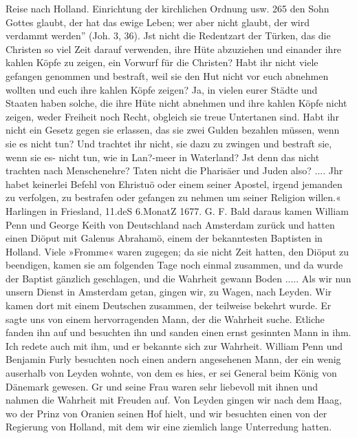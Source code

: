 Reise nach Holland. Einrichtung der kirchlichen Ordnung usw. 265
den Sohn Gottes glaubt, der hat das ewige Leben; wer aber
nicht glaubt, der wird verdammt werden'' (Joh. 3, 36). Jst
nicht die Redentzart der Türken, das die Christen so viel Zeit
darauf verwenden, ihre Hüte abzuziehen und einander ihre kahlen
Köpfe zu zeigen, ein Vorwurf für die Christen? Habt ihr nicht
viele gefangen genommen und bestraft, weil sie den Hut nicht vor
euch abnehmen wollten und euch ihre kahlen Köpfe zeigen? Ja,
in vielen eurer Städte und Staaten haben solche, die ihre Hüte
nicht abnehmen und ihre kahlen Köpfe nicht zeigen, weder Freiheit
noch Recht, obgleich sie treue Untertanen sind. Habt ihr nicht
ein Gesetz gegen sie erlassen, das sie zwei Gulden bezahlen müssen,
wenn sie es nicht tun? Und trachtet ihr nicht, sie dazu zu zwingen
und bestraft sie, wenn sie es- nicht tun, wie in Lan?-meer in
Waterland? Jst denn das nicht trachten nach Menschenehre?
Taten nicht die Pharisäer und Juden also? ....
Jhr habet keinerlei Befehl von Ehristuö oder einem seiner
Apostel, irgend jemanden zu verfolgen, zu bestrafen oder gefangen
zu nehmen um seiner Religion willen.«
Harlingen in Friesland, 11.deS 6.MonatZ 1677. G. F.
Bald daraus kamen William Penn und George Keith von
Deutschland nach Amsterdam zurück und hatten einen Diöput mit
Galenus Abrahamö, einem der bekanntesten Baptisten in Holland.
Viele »Fromme« waren zugegen; da sie nicht Zeit hatten, den
Diöput zu beendigen, kamen sie am folgenden Tage noch einmal
zusammen, und da wurde der Baptist gänzlich geschlagen, und die
Wahrheit gewann Boden ..... Als wir nun unsern Dienst in
Amsterdam getan, gingen wir, zu Wagen, nach Leyden. Wir
kamen dort mit einem Deutschen zusammen, der teilweise bekehrt
wurde. Er sagte uns von einem hervorragenden Mann, der die
Wahrheit suche. Etliche fanden ihn auf und besuchten ihn und
sanden einen ernst gesinnten Mann in ihm. Ich redete auch mit
ihm, und er bekannte sich zur Wahrheit. William Penn und Benjamin
Furly besuchten noch einen andern angesehenen Mann, der ein wenig
auserhalb von Leyden wohnte, von dem es hies, er sei General
beim König von Dänemark gewesen. Gr und seine Frau waren
sehr liebevoll mit ihnen und nahmen die Wahrheit mit Freuden auf.
Von Leyden gingen wir nach dem Haag, wo der Prinz von
Oranien seinen Hof hielt, und wir besuchten einen von der Regierung
von Holland, mit dem wir eine ziemlich lange Unterredung hatten.


